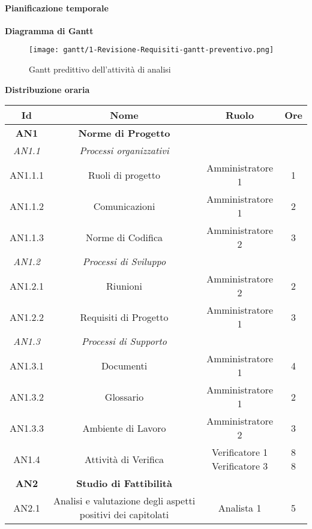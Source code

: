 \documentclass{scalatekids-article}
\begin{document}
\newpage
\paragraph{Pianificazione temporale}
\textbf{Diagramma di Gantt}
\begin{figure}[H]
  \texttt{[image: gantt/1-Revisione-Requisiti-gantt-preventivo.png]}
  \caption{Gantt predittivo dell'attività di analisi}
\end{figure}

\newpage
\textbf{Distribuzione oraria}
\scriptsize
\begin{center}
  \begin{tabular}{| c | c | c | c |}
    \hline
    \textbf{Id} & \textbf{Nome} & \textbf{Ruolo} & \textbf{Ore}\\
    \hline
    \textbf{AN1} & \textbf{Norme di Progetto} & &\\
    \hline
    \textit{AN1.1} & \textit{Processi organizzativi} & &\\
    \hline
    AN1.1.1 & Ruoli di progetto & Amministratore 1 & 1\\
    \hline
    AN1.1.2 & Comunicazioni & Amministratore 1 & 2\\
    \hline
    AN1.1.3 & Norme di Codifica & Amministratore 2 & 3\\
    \hline
    \textit{AN1.2} & \textit{Processi di Sviluppo} & &\\
    \hline
    AN1.2.1 & Riunioni & Amministratore 2 & 2\\
    \hline
    AN1.2.2 & Requisiti di Progetto & Amministratore 1 & 3\\
    \hline
    \textit{AN1.3} & \textit{Processi di Supporto} & &\\
    \hline
    AN1.3.1 & Documenti & Amministratore 1 & 4\\
    \hline
    AN1.3.2 & Glossario & Amministratore 1 & 2\\
    \hline
    AN1.3.3 & Ambiente di Lavoro & Amministratore 2 & 3\\
    \hline
    AN1.4 & Attività di Verifica & \multiLineCell[t]{Verificatore 1\\Verificatore 3} & \multiLineCell[t]{8\\8}\\
    \hline
    \textbf{AN2} & \textbf{Studio di Fattibilità} & &\\
    \hline
    AN2.1 & Analisi e valutazione degli aspetti positivi dei capitolati & Analista 1 & 5\\

\end{tabular}
\end{center}
\end{document}
